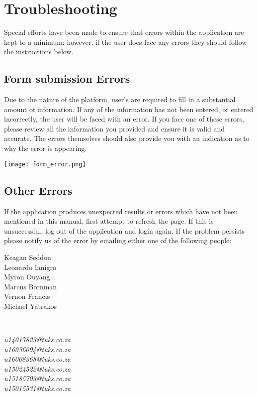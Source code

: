 \documentclass[12pt]{article}
\begin{document}
\section{Troubleshooting}
Special efforts have been made to ensure that errors within the application are kept to a minimum; however, if the user does face any errors they should follow the instructions below.

\subsection{Form submission Errors}
Due to the nature of the platform, user's are required to fill in a substantial amount of information. If any of the information has not been entered, or entered incorrectly, the user will be faced with an error. If you face one of these errors, please review all the information you provided and ensure it is valid and accurate. The errors themselves should also provide you with an indication as to why the error is appearing.
\begin{center}
\texttt{[image: form\_error.png]}
\end{center}

\subsection{Other Errors}
If the application produces unexpected results or errors which have not been mentioned in this manual, first attempt to refresh the page. If this is unsuccessful, log out of the application and login again. If the problem persists please notify us of the error by emailing either one of the following people:
\begin{center}
\begin{minipage}{0.4\textwidth}
\begin{flushleft}
{Keagan Seddon}\\
{Leonardo Ianigro}\\
{Myron Ouyang}\\
{Marcus Bornman}\\
{Vernon Francis}\\
{Michael Yatrakos}
\end{flushleft}
\end{minipage}
~
\begin{minipage}{0.4\textwidth}
\begin{flushright}
\emph{u14017823@tuks.co.za} \\
\emph{u16036094@tuks.co.za} \\
\emph{u16008368@tuks.co.za} \\
\emph{u15024522@tuks.co.za} \\
\emph{u15185703@tuks.co.za} \\
\emph{u15015531@tuks.co.za} \\
\end{flushright}
\end{minipage}\\
\end{center}
\end{document}
